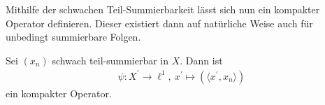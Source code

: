 Mithilfe der schwachen Teil-Summierbarkeit lässt sich nun ein kompakter Operator definieren.
Dieser existiert dann auf natürliche Weise auch für unbedingt summierbare Folgen.


\begin{lem}\label{th:weak_subseries_implies_compact}
	Sei $ (x_n) $ schwach teil-summierbar in $ X $.
	Dann ist 
	\begin{align}\label{eq:compact_operator_charact_uncond_conv_1}
		\psi  :  X^\prime \to \ell^1, \
		x^\prime \mapsto (\langle x^\prime , x_n \rangle)
	\end{align}
	ein kompakter Operator.
\end{lem}

